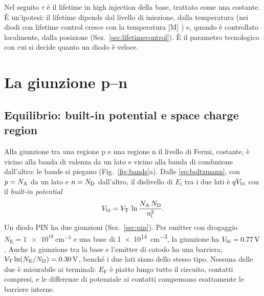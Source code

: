 \documentclass[10pt,a4paper]{scrartcl}
\let\newcommand\pdvaluedefine
\newcommand{\VT}{V_\mathrm{T}}
\newcommand{\ND}{N_\mathrm{D}}
\newcommand{\NA}{N_\mathrm{A}}
\newcommand{\nint}{n_\mathrm{i}}
\newcommand{\Vbi}{V_\mathrm{bi}}
\newcommand{\Pp}{p\textsuperscript{+}}
\newcommand{\Nm}{n\textsuperscript{--}}
\newcommand{\Np}{n\textsuperscript{+}}
\begin{document}
Nel seguito $\tau$ è il lifetime in high injection della base, trattato come una costante. È un'ipotesi: il lifetime dipende dal livello di iniezione, dalla temperatura (nei diodi con lifetime control cresce con la temperatura [M] \cite{lutz}) e, quando è controllato localmente, dalla posizione (Sez.~\ref{sec:lifetimecontrol}). È il parametro tecnologico con cui si decide quanto un diodo è veloce.

\section{La giunzione p--n}
\label{sec:junction}
\subsection{Equilibrio: built-in potential e space charge region}
\label{sec:equilibrium}
Alla giunzione tra una regione p e una regione n il livello di Fermi, costante, è vicino alla banda di valenza da un lato e vicino alla banda di conduzione dall'altro: le bande si piegano (Fig.~\ref{fig:bands}a). Dalle \eqref{eq:boltzmann}, con $p = \NA$ da un lato e $n = \ND$ dall'altro, il dislivello di $E_\mathrm{i}$ tra i due lati è $q\Vbi$ con il \emph{built-in potential}
\begin{equation}
\Vbi = \VT\,\ln\frac{\NA\,\ND}{\nint^2} .
\label{eq:vbi}
\end{equation}
Un diodo PIN ha due giunzioni (Sez.~\ref{sec:pin}). Per emitter con drogaggio $N_\mathrm{E} = \SI{1e19}{\centi\metre^{-3}}$ e una base \Nm{} di \SI{1e14}{\centi\metre^{-3}}, la giunzione \Pp\Nm{} ha $\Vbi = \SI{\pdVbi}{\volt}$. Anche la giunzione \Nm\Np{} tra la base e l'emitter di catodo ha una barriera, $\VT\ln(N_\mathrm{E}/\ND) = \SI{\pdVbiTwo}{\volt}$, benché i due lati siano dello stesso tipo. Nessuna delle due è misurabile ai terminali: $E_\mathrm{F}$ è piatto lungo tutto il circuito, contatti compresi, e le differenze di potenziale ai contatti compensano esattamente le barriere interne.
\end{document}
